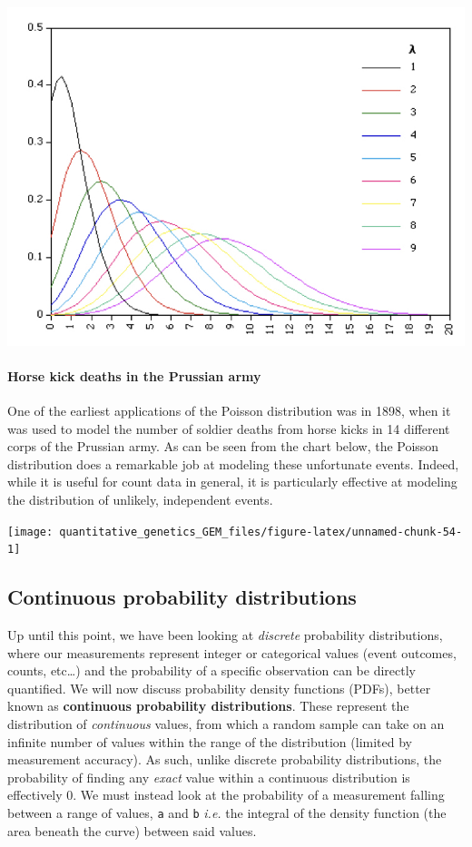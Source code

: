 \documentclass[
]{book}
\begin{document}
\begin{center}\includegraphics[width=0.7\linewidth]{images/week_2.005} \end{center}

\hypertarget{horse-kick-deaths-in-the-prussian-army}{%
\paragraph{Horse kick deaths in the Prussian army}\label{horse-kick-deaths-in-the-prussian-army}}

One of the earliest applications of the Poisson distribution was in 1898, when it was used to model the number of soldier deaths from horse kicks in 14 different corps of the Prussian army. As can be seen from the chart below, the Poisson distribution does a remarkable job at modeling these unfortunate events. Indeed, while it is useful for count data in general, it is particularly effective at modeling the distribution of unlikely, independent events.

\begin{center}\texttt{[image: quantitative\_genetics\_GEM\_files/figure-latex/unnamed-chunk-54-1]} \end{center}

\hypertarget{continuous-probability-distributions}{%
\subsection{\texorpdfstring{\textbf{Continuous probability distributions}}{Continuous probability distributions}}\label{continuous-probability-distributions}}

Up until this point, we have been looking at \emph{discrete} probability distributions, where our measurements represent integer or categorical values (event outcomes, counts, etc\ldots) and the probability of a specific observation can be directly quantified. We will now discuss probability density functions (PDFs), better known as \textbf{continuous probability distributions}. These represent the distribution of \emph{continuous} values, from which a random sample can take on an infinite number of values within the range of the distribution (limited by measurement accuracy). As such, unlike discrete probability distributions, the probability of finding any \emph{exact} value within a continuous distribution is effectively 0. We must instead look at the probability of a measurement falling between a range of values, \texttt{a} and \texttt{b} \emph{i.e.} the integral of the density function (the area beneath the curve) between said values.
\end{document}
